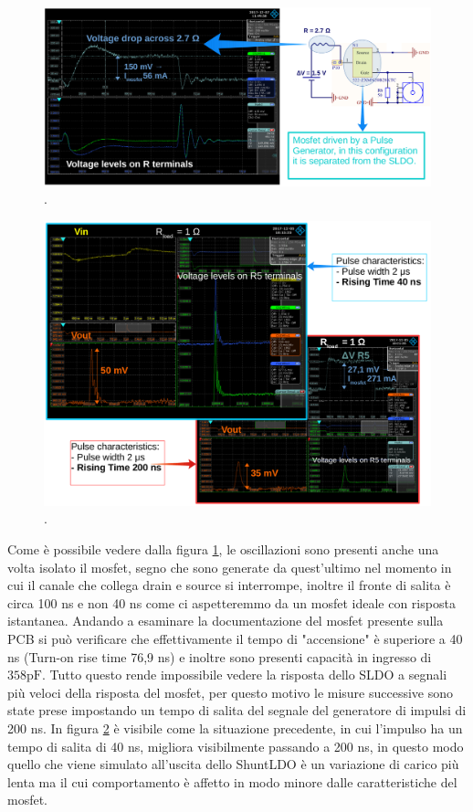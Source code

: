 \begin{figure}
\centering
\includegraphics[scale=.3]{Immagini/MosfetBehaviour}
\caption{.}
\label{MosfetBehaviour}
\end{figure}

\begin{figure}
\centering
\includegraphics[scale=.3]{Immagini/RiseTime}
\caption{.}
\label{RiseTime}
\end{figure}

Come è possibile vedere dalla figura \ref{MosfetBehaviour}, le oscillazioni sono presenti anche una volta isolato il mosfet, segno che sono generate da quest'ultimo nel momento in cui il canale che collega drain e source si interrompe, inoltre il fronte di salita è circa 100 ns e non 40 ns come ci aspetteremmo da un mosfet ideale con risposta istantanea. Andando a esaminare la documentazione del mosfet presente sulla PCB 
si può verificare che effettivamente il tempo di "accensione" è superiore a 40 ns (Turn-on rise time 76,9 ns) e inoltre sono presenti capacità in ingresso di $\mathrm{358 pF}$. Tutto questo rende impossibile vedere la risposta dello SLDO a segnali più veloci della risposta del mosfet, per questo motivo le misure successive sono state prese impostando un tempo di salita del segnale del generatore di impulsi di 200 ns.
In figura \ref{RiseTime} è visibile come la situazione precedente, in cui l'impulso ha un tempo di salita di 40 ns, migliora visibilmente passando a 200 ns, in questo modo quello che viene simulato all'uscita dello ShuntLDO è un variazione di carico più lenta ma il cui comportamento è affetto in modo minore dalle caratteristiche del mosfet. 

